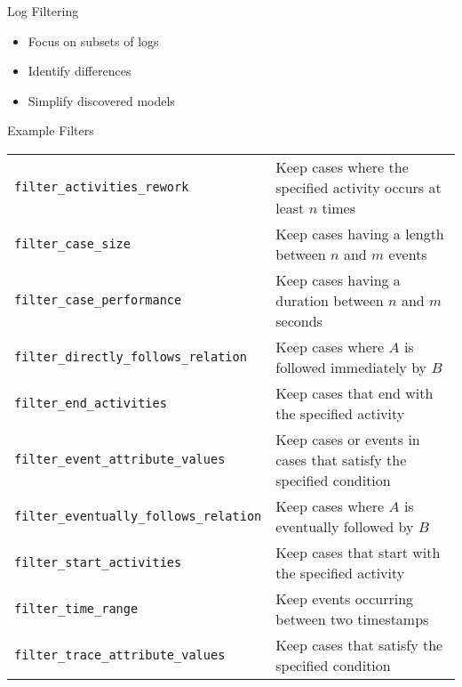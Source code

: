 \documentclass[ignorenonframetext,xcolor=x11names]{beamer}
\begin{document}
\begin{frame}{Log Filtering}
\begin{itemize}
    \item Focus on subsets of logs
    \item Identify differences
    \item Simplify discovered models
\end{itemize}
\end{frame}

\begin{frame}{Example Filters}
\scriptsize
\renewcommand{\arraystretch}{1.25}
\begin{tabularx}{\textwidth}{l|X} \hline 
\texttt{filter\_activities\_rework} & Keep cases where the specified activity occurs at least $n$ times \\
\texttt{filter\_case\_size} & Keep cases having a length between $n$ and $m$ events \\
\texttt{filter\_case\_performance} & Keep cases having a duration between $n$ and $m$ seconds \\
\texttt{filter\_directly\_follows\_relation} & Keep cases where $A$ is followed immediately by $B$ \\
\texttt{filter\_end\_activities} & Keep cases that end with the specified activity \\
\texttt{filter\_event\_attribute\_values} & Keep cases or events in cases that satisfy the specified condition \\ 
\texttt{filter\_eventually\_follows\_relation} & Keep cases where $A$ is eventually followed by $B$ \\
\texttt{filter\_start\_activities} & Keep cases that start with the specified activity \\
\texttt{filter\_time\_range} & Keep events occurring between two timestamps \\
\texttt{filter\_trace\_attribute\_values} & Keep cases that satisfy the specified condition \\ \hline
\end{tabularx}
\end{frame}
\end{document}
